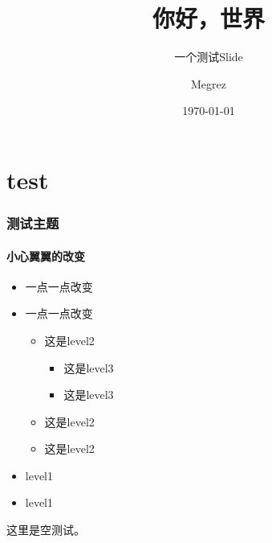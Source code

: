 \documentclass[t,12pt]{beamer}
\begin{document}
\title{你好，世界}
\subtitle{\longdash 一个测试Slide}
\author[del2z]{Megrez}
\date{\today}

\begin{frame}
\titlepage
\end{frame}

\section{test}
\begin{frame}
\frametitle{测试主题}
\framesubtitle{小心翼翼的改变}
\begin{itemize}
  \item<1-> 一点一点改变
  \item<2-> 一点一点改变
  \begin{itemize}
    \item 这是level2
    \begin{itemize}
       \item 这是level3
       \item 这是level3
    \end{itemize}
    \item 这是level2
    \item 这是level2
  \end{itemize}
  \item<2-> level1
  \item<2-> level1
\end{itemize}
\end{frame}

\begin{frame}
这里是空测试。
\end{frame}

\begin{frame}
\lastpage
\end{frame}
\end{document}
